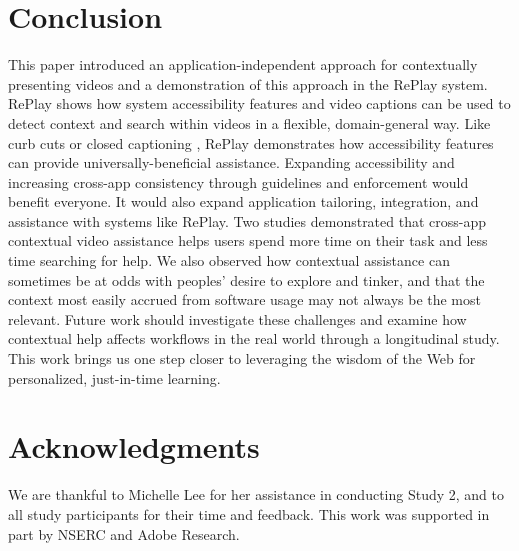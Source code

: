 \section{Conclusion}
This paper introduced an application-independent approach for contextually presenting videos and a demonstration of this approach in the RePlay system. RePlay shows how system accessibility features and video captions can be used to detect context and search within videos in a flexible, domain-general way. Like curb cuts or closed captioning \cite{Rose2002}, RePlay demonstrates how accessibility features can provide universally-beneficial assistance. 
Expanding accessibility and increasing cross-app consistency through guidelines and enforcement would benefit everyone. It would also expand application tailoring, integration, and assistance with systems like RePlay. Two studies demonstrated that cross-app contextual video assistance helps users spend more time on their task and less time searching for help. We also observed how contextual assistance can sometimes be at odds with peoples' desire to explore and tinker, and that the context most easily accrued from software usage may not always be the most relevant. Future work should investigate these challenges and examine how contextual help affects workflows in the real world through a longitudinal study. This work brings us one step closer to leveraging the wisdom of the Web for personalized, just-in-time learning.

\section{Acknowledgments}
We are thankful to Michelle Lee for her assistance in conducting Study 2, and to all study participants for their time and feedback. This work was supported in part by NSERC and Adobe Research.